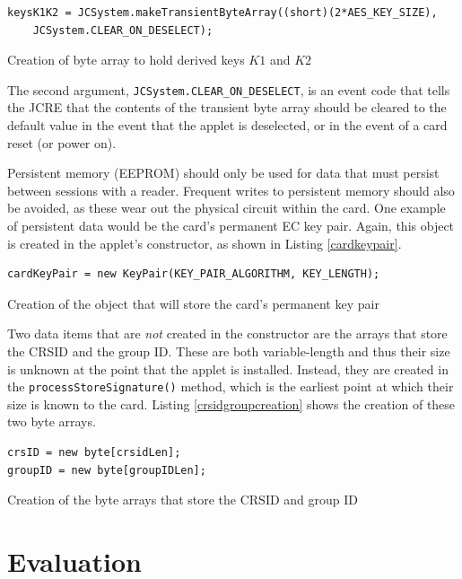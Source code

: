 \documentclass[12pt,a4paper,twoside,openright]{report}
\begin{document}
\begin{listing}
\begin{verbatim}
keysK1K2 = JCSystem.makeTransientByteArray((short)(2*AES_KEY_SIZE),
    JCSystem.CLEAR_ON_DESELECT);
\end{verbatim}
\caption{Creation of byte array to hold derived keys $K1$ and $K2$}
\label{k1k2array}
\end{listing}

\noindent
The second argument, \texttt{JCSystem.CLEAR\_ON\_DESELECT}, is an event code that tells the JCRE that the contents of the transient byte array should be cleared to the default value in the event that the applet is deselected, or in the event of a card reset (or power on).

Persistent memory (EEPROM) should only be used for data that must persist between sessions with a reader. Frequent writes to persistent memory should also be avoided, as these wear out the physical circuit within the card. One example of persistent data would be the card's permanent EC key pair. Again, this object is created in the applet's constructor, as shown in Listing \autoref{cardkeypair}.

\begin{listing}
\begin{verbatim}
cardKeyPair = new KeyPair(KEY_PAIR_ALGORITHM, KEY_LENGTH);
\end{verbatim}
\caption{Creation of the object that will store the card's permanent key pair}
\label{cardkeypair}
\end{listing}

\noindent
Two data items that are \emph{not} created in the constructor are the arrays that store the CRSID and the group ID. These are both variable-length and thus their size is unknown at the point that the applet is installed. Instead, they are created in the \texttt{processStoreSignature()} method, which is the earliest point at which their size is known to the card. Listing \autoref{crsidgroupcreation} shows the creation of these two byte arrays.

\begin{listing}
\begin{verbatim}
crsID = new byte[crsidLen];
groupID = new byte[groupIDLen];
\end{verbatim}
\caption{Creation of the byte arrays that store the CRSID and group ID}
\label{crsidgroupcreation}
\end{listing}

\chapter{Evaluation}
\end{document}
